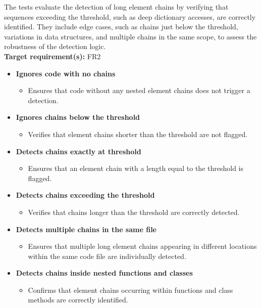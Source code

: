\documentclass[12pt, titlepage]{article}
\begin{document}
\noindent The tests evaluate the detection of long element chains by verifying that sequences exceeding the threshold, such as deep dictionary accesses, are correctly identified. They include edge cases, such as chains just below the threshold, variations in data structures, and multiple chains in the same scope, to assess the robustness of the detection logic.\\

\noindent\textbf{Target requirement(s):} FR2~\cite{SRS} \\

\begin{itemize}
  \item \textbf{Ignores code with no chains}
  \begin{itemize}
      \item Ensures that code without any nested element chains does not trigger a detection.
  \end{itemize}

  \item \textbf{Ignores chains below the threshold}
  \begin{itemize}
      \item Verifies that element chains shorter than the threshold are not flagged.
  \end{itemize}

  \item \textbf{Detects chains exactly at threshold}
  \begin{itemize}
      \item Ensures that an element chain with a length equal to the threshold is flagged.
  \end{itemize}

  \item \textbf{Detects chains exceeding the threshold}
  \begin{itemize}
      \item Verifies that chains longer than the threshold are correctly detected.
  \end{itemize}

  \item \textbf{Detects multiple chains in the same file}
  \begin{itemize}
      \item Ensures that multiple long element chains appearing in different locations within the same code file are individually detected.
  \end{itemize}

  \item \textbf{Detects chains inside nested functions and classes}
  \begin{itemize}
      \item Confirms that element chains occurring within functions and class methods are correctly identified.
  \end{itemize}


\end{itemize}
\end{document}
